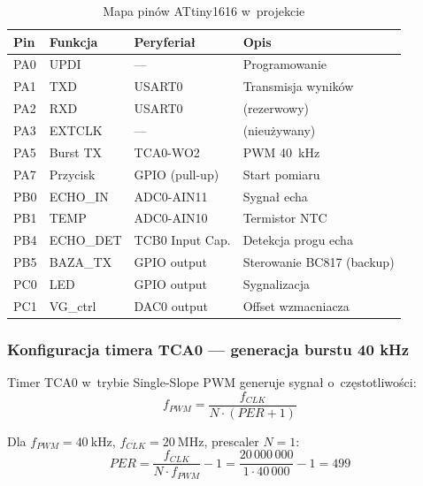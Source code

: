 \documentclass[a4paper,11pt]{article}
\begin{document}
\begin{table}[H]
    \centering
    \caption{Mapa pinów ATtiny1616 w~projekcie}
    \label{tab:pinout}
    \begin{tabular}{llll}
        \toprule
        \textbf{Pin} & \textbf{Funkcja} & \textbf{Peryferiał} & \textbf{Opis} \\
        \midrule
        PA0 & UPDI & --- & Programowanie \\
        PA1 & TXD & USART0 & Transmisja wyników \\
        PA2 & RXD & USART0 & (rezerwowy) \\
        PA3 & EXTCLK & --- & (nieużywany) \\
        PA5 & Burst TX & TCA0-WO2 & PWM \SI{40}{\kilo\hertz} \\
        PA7 & Przycisk & GPIO (pull-up) & Start pomiaru \\
        PB0 & ECHO\_IN & ADC0-AIN11 & Sygnał echa \\
        PB1 & TEMP & ADC0-AIN10 & Termistor NTC \\
        PB4 & ECHO\_DET & TCB0 Input Cap. & Detekcja progu echa \\
        PB5 & BAZA\_TX & GPIO output & Sterowanie BC817 (backup) \\
        PC0 & LED & GPIO output & Sygnalizacja \\
        PC1 & VG\_ctrl & DAC0 output & Offset wzmacniacza \\
        \bottomrule
    \end{tabular}
\end{table}

\subsubsection{Konfiguracja timera TCA0 --- generacja burstu 40 kHz}

Timer TCA0 w~trybie Single-Slope PWM generuje sygnał o~częstotliwości:
\begin{equation}
    f_{PWM} = \frac{f_{CLK}}{N \cdot (PER + 1)}
    \label{eq:pwm_freq}
\end{equation}

Dla $f_{PWM} = \SI{40}{\kilo\hertz}$, $f_{CLK} = \SI{20}{\mega\hertz}$,
prescaler $N = 1$:
\begin{equation}
    PER = \frac{f_{CLK}}{N \cdot f_{PWM}} - 1 = \frac{20\,000\,000}{1 \cdot 40\,000} - 1 = 499
    \label{eq:per_value}
\end{equation}
\end{document}
